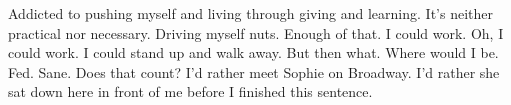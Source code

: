 

Addicted to pushing myself and living through giving and learning.
It's neither practical nor necessary.  Driving myself nuts.  Enough of
that.  I could work.  Oh, I could work.  I could stand up and walk
away.  But then what.  Where would I be.  Fed.  Sane.  Does that
count?  I'd rather meet Sophie on Broadway.  I'd rather she sat down
here in front of me before I finished this sentence.

\bye
